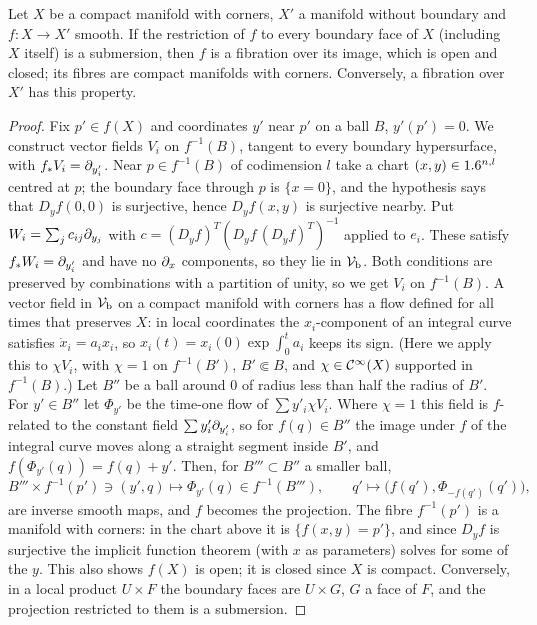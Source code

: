 \begin{proposition}\label{blowup:prop:fibration}
Let $X$ be a compact manifold with corners, $X'$ a manifold without boundary and $f:X\to
X'$ smooth. If the restriction of $f$ to every boundary face of $X$ \textup{(}including
$X$ itself\textup{)} is a submersion, then $f$ is a fibration over its image, which is open
and closed; its fibres are compact manifolds with corners. Conversely, a fibration over
$X'$ has this property.
\end{proposition}
\begin{proof}
Fix $p'\in f(X)$ and coordinates $y'$ near $p'$ on a ball $B$, $y'(p')=0$. We construct
vector fields $V_i$ on $f^{-1}(B)$, tangent to every boundary hypersurface, with
$f_*V_i=\partial_{y'_i}$. Near $p\in f^{-1}(B)$ of codimension $l$ take a chart $(x,y)\in1.6^{n,l}$
centred at $p$; the boundary face through $p$ is $\{x=0\}$, and the hypothesis says that
$D_yf(0,0)$ is surjective, hence $D_yf(x,y)$ is surjective nearby. Put
$W_i=\sum_jc_{ij}\partial_{y_j}$ with $c=(D_yf)^T(D_yf\,(D_yf)^T)^{-1}$ applied to $e_i$. These
satisfy $f_*W_i=\partial_{y'_i}$ and have no $\partial_x$ components, so they lie in $\mathcal{V}_{\mathrm{b}}$. Both
conditions are preserved by combinations with a partition of unity, so we get $V_i$ on
$f^{-1}(B)$. A vector field in $\mathcal{V}_{\mathrm{b}}$ on a compact manifold with corners has a flow defined
for all times that preserves $X$: in local coordinates the $x_i$-component of an integral
curve satisfies $\dot x_i=a_ix_i$, so $x_i(t)=x_i(0)\exp\int_0^ta_i$ keeps its sign.
(Here we apply this to $\chi V_i$, with $\chi=1$ on $f^{-1}(B')$, $B'\Subset B$, and
$\chi\in\mathcal{C}^\infty(X)$ supported in $f^{-1}(B)$.) Let $B''$ be a ball around $0$ of radius less than half the radius of $B'$. For
$y'\in B''$ let $\Phi_{y'}$ be the time-one flow of $\sum y'_i\chi V_i$. Where $\chi=1$ this
field is $f$-related to the constant field $\sum y'_i\partial_{y'_i}$, so for $f(q)\in B''$ the
image under $f$ of the integral curve moves along a straight segment inside $B'$, and
$f(\Phi_{y'}(q))=f(q)+y'$. Then, for $B'''\subset B''$ a smaller ball,
\begin{equation*}
  B'''\times f^{-1}(p')\ni(y',q)\longmapsto\Phi_{y'}(q)\in f^{-1}(B'''),\qquad
  q'\longmapsto\big(f(q'),\Phi_{-f(q')}(q')\big),
\end{equation*}
are inverse smooth maps, and $f$ becomes the projection. The fibre $f^{-1}(p')$ is a
manifold with corners: in the chart above it is $\{f(x,y)=p'\}$, and since $D_yf$ is
surjective the implicit function theorem (with $x$ as parameters) solves for some of the
$y$. This also shows $f(X)$ is open; it is closed since $X$ is compact. Conversely, in a
local product $U\times F$ the boundary faces are $U\times G$, $G$ a face of $F$, and the
projection restricted to them is a submersion.
\end{proof}

